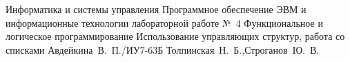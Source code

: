 \documentclass{bmstu}
\begin{document}
	\makereporttitle
	{Информатика и системы управления} %
	{Программное обеспечение ЭВМ и информационные технологии} %
	{лабораторной работе №~4} %
	{Функциональное и логическое программирование} %
	{Использование управляющих структур, работа со списками} %
	{} %
	{Авдейкина~В.~П./ИУ7-63Б} %
	{Толпинская~Н.~Б.,Строганов~Ю.~В.} %
\end{document}
